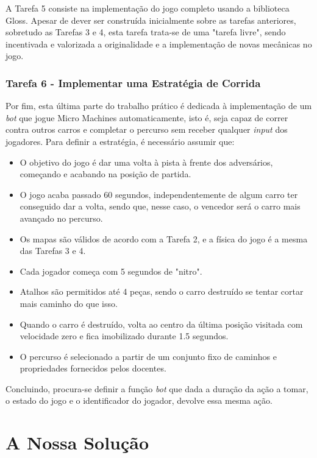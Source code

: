 \documentclass[a4paper]{report}
\begin{document}
A Tarefa 5 consiste na implementação do jogo completo usando a biblioteca Gloss. Apesar de dever ser construída inicialmente sobre as tarefas anteriores, sobretudo as Tarefas 3 e 4, esta tarefa trata-se de uma "tarefa livre", sendo incentivada e valorizada a originalidade e a implementação de novas mecânicas no jogo.

\subsection{Tarefa 6 - Implementar uma Estratégia de Corrida}

Por fim, esta última parte do trabalho prático é dedicada à implementação de um \textit{bot} que jogue Micro Machines automaticamente, isto é, seja capaz de correr contra outros carros e completar o percurso sem receber qualquer \textit{input} dos jogadores. Para definir a estratégia, é necessário assumir que:

\begin{itemize}
    \item O objetivo do jogo é dar uma volta à pista à frente dos adversários, começando e acabando na posição de partida.
    \item O jogo acaba passado 60 segundos, independentemente de algum carro ter conseguido dar a volta, sendo que, nesse caso, o vencedor será o carro mais avançado no percurso.
    \item Os mapas são válidos de acordo com a Tarefa 2, e a física do jogo é a mesma das Tarefas 3 e 4.
    \item Cada jogador começa com 5 segundos de "nitro".
    \item Atalhos são permitidos até 4 peças, sendo o carro destruído se tentar cortar mais caminho do que isso.
    \item Quando o carro é destruído, volta ao centro da última posição visitada com velocidade zero e fica imobilizado durante 1.5 segundos.
    \item O percurso é selecionado a partir de um conjunto fixo de caminhos e propriedades fornecidos pelos docentes.
\end{itemize}

Concluindo, procura-se definir a função \textit{bot} que dada a duração da ação a tomar, o estado do jogo e o identificador do jogador, devolve essa mesma ação.



\chapter{A Nossa Solução}
\end{document}
